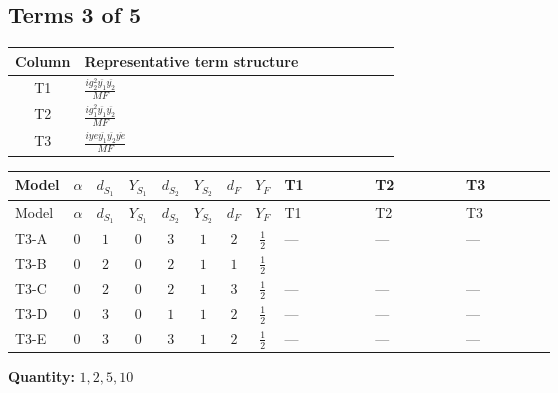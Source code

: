\documentclass[8pt]{article}
\begin{document}
\begin{landscape}
\subsection*{Terms 3 of 5}
\begin{center}
\begin{tabular}{@{}c >{\raggedright\arraybackslash}p{0.82\linewidth}@{}}
\toprule
Column & Representative term structure \\
\midrule
T1 & \(\displaystyle \frac{i g_{2}^{2} \overline{y_{1}} \overline{y_{2}}}{MF}\) \\
\midrule
T2 & \(\displaystyle \frac{i g_{1}^{2} \overline{y_{1}} \overline{y_{2}}}{MF}\) \\
\midrule
T3 & \(\displaystyle \frac{i ye \overline{y_{1}} \overline{y_{2}} \overline{ye}}{MF}\) \\
\midrule
\bottomrule
\end{tabular}
\end{center}
\smallskip
\tiny
\begin{longtable}{@{}llcccccc >{\raggedright\arraybackslash}p{0.21\linewidth} >{\raggedright\arraybackslash}p{0.21\linewidth} >{\raggedright\arraybackslash}p{0.21\linewidth}@{}}
\toprule
Model & $\alpha$ & $d_{S_1}$ & $Y_{S_1}$ & $d_{S_2}$ & $Y_{S_2}$ & $d_F$ & $Y_F$ & T1 & T2 & T3 \\
\midrule
\endfirsthead
\toprule
Model & $\alpha$ & $d_{S_1}$ & $Y_{S_1}$ & $d_{S_2}$ & $Y_{S_2}$ & $d_F$ & $Y_F$ & T1 & T2 & T3 \\
\midrule
\endhead
T3-A & $0$ & $1$ & $0$ & $3$ & $1$ & $2$ & $\frac{1}{2}$ & --- & --- & --- \\
\midrule
T3-B & $0$ & $2$ & $0$ & $2$ & $1$ & $1$ & $\frac{1}{2}$ & \scriptsize\adjustbox{max width=\linewidth}{$\begin{gathered} \frac{3 i g_{2}^{2} \overline{y_{1}} \overline{y_{2}}}{8 MF}\end{gathered}$} & \scriptsize\adjustbox{max width=\linewidth}{$\begin{gathered} \frac{3 i g_{1}^{2} \overline{y_{1}} \overline{y_{2}}}{16 MF}\end{gathered}$} & \scriptsize\adjustbox{max width=\linewidth}{$\begin{gathered} - \frac{i ye \overline{y_{1}} \overline{y_{2}} \overline{ye}}{8 MF}\end{gathered}$} \\
\midrule
T3-C & $0$ & $2$ & $0$ & $2$ & $1$ & $3$ & $\frac{1}{2}$ & --- & --- & --- \\
\midrule
T3-D & $0$ & $3$ & $0$ & $1$ & $1$ & $2$ & $\frac{1}{2}$ & --- & --- & --- \\
\midrule
T3-E & $0$ & $3$ & $0$ & $3$ & $1$ & $2$ & $\frac{1}{2}$ & --- & --- & --- \\
\midrule
\bottomrule
\end{longtable}
\clearpage
\noindent\textbf{Quantity: }$\mathrm{1,2,5,10}$\par\smallskip

\end{landscape}
\end{document}
